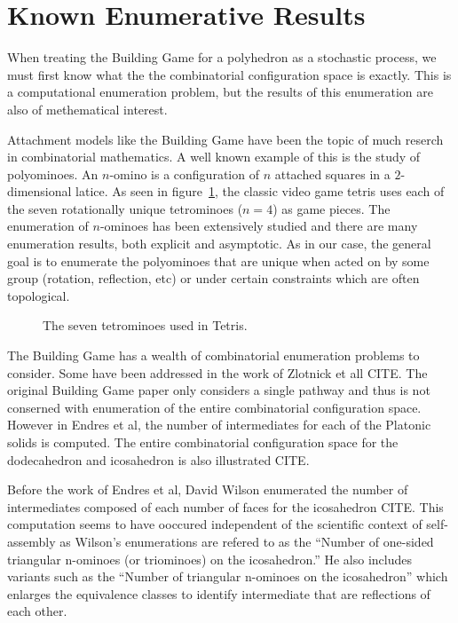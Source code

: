 \section{Known Enumerative Results}

When treating the Building Game for a polyhedron as a stochastic process, we must first know what the the combinatorial configuration space is exactly. This is a computational enumeration problem, but the results of this enumeration are also of methematical interest. 

Attachment models like the Building Game have been the topic of much reserch in combinatorial mathematics. A well known example of this is the study of polyominoes. An $n$-omino is a configuration of $n$ attached squares in a $2$-dimensional latice. As seen in figure~\ref{fig:Tetris}, the classic video game tetris uses each of the seven rotationally unique tetrominoes ($n = 4$) as game pieces. The enumeration of $n$-ominoes has been extensively studied and there are many enumeration results, both explicit and asymptotic. As in our case, the general goal is to enumerate the polyominoes that are unique when acted on by some group (rotation, reflection, etc) or under certain constraints which are often topological.
\begin{figure}[ht]
\caption{The seven tetrominoes used in Tetris.}
\label{fig:Tetris}
\end{figure}

The Building Game has a wealth of combinatorial enumeration problems to consider. Some have been addressed in the work of Zlotnick et all CITE. The original Building Game paper only considers a single pathway and thus is not conserned with enumeration of the entire combinatorial configuration space. However in Endres et al, the number of intermediates for each of the Platonic solids is computed. The entire combinatorial configuration space for the dodecahedron and icosahedron is also illustrated CITE. 

Before the work of Endres et al, David Wilson enumerated the number of intermediates composed of each number of faces for the icosahedron CITE. This computation seems to have ooccured independent of the scientific context of self-assembly as Wilson's enumerations are refered to as the ``Number of one-sided triangular n-ominoes (or triominoes) on the icosahedron.'' He also includes variants such as the ``Number of triangular n-ominoes on the icosahedron'' which enlarges the equivalence classes to identify intermediate that are reflections of each other. 

